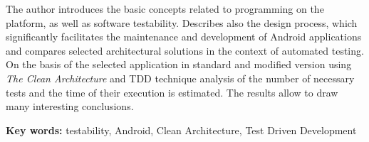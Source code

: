 The author introduces the basic concepts related to programming on the platform, as well as software testability. Describes also the design process, which significantly facilitates the maintenance and development of Android applications and compares selected architectural solutions in the context of automated testing. On the basis of the selected application in standard and modified version using \textit{The Clean Architecture} and TDD technique analysis of the number of necessary tests and the time of their execution is estimated. The results allow to draw many interesting conclusions.

\textbf{Key words:} testability, Android, Clean Architecture, Test Driven Development


